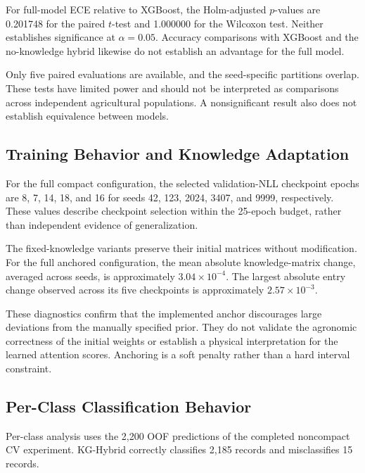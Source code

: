 For full-model ECE relative to XGBoost, the Holm-adjusted
$p$-values are 0.201748 for the paired $t$-test and 1.000000
for the Wilcoxon test. Neither establishes significance at
$\alpha=0.05$. Accuracy comparisons with XGBoost and the
no-knowledge hybrid likewise do not establish an advantage
for the full model.

Only five paired evaluations are available, and the seed-specific
partitions overlap. These tests have limited power and should not
be interpreted as comparisons across independent agricultural
populations. A nonsignificant result also does not establish
equivalence between models.

\subsection{Training Behavior and Knowledge Adaptation}

For the full compact configuration, the selected validation-NLL
checkpoint epochs are 8, 7, 14, 18, and 16 for seeds
42, 123, 2024, 3407, and 9999, respectively.
These values describe checkpoint selection within the
25-epoch budget, rather than independent evidence of generalization.

The fixed-knowledge variants preserve their initial matrices
without modification. For the full anchored configuration,
the mean absolute knowledge-matrix change, averaged across seeds,
is approximately $3.04\times10^{-4}$.
The largest absolute entry change observed across its five
checkpoints is approximately $2.57\times10^{-3}$.

These diagnostics confirm that the implemented anchor discourages
large deviations from the manually specified prior.
They do not validate the agronomic correctness of the initial
weights or establish a physical interpretation for the learned
attention scores. Anchoring is a soft penalty rather than a
hard interval constraint.

\subsection{Per-Class Classification Behavior}

Per-class analysis uses the 2,200 OOF predictions of the completed
noncompact CV experiment. KG-Hybrid correctly classifies
2,185 records and misclassifies 15 records.

